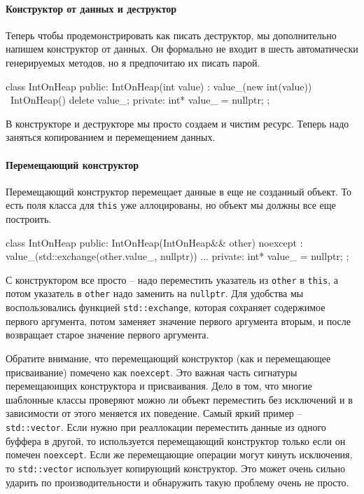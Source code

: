 \paragraph{Конструктор от данных и деструктор}

Теперь чтобы продемонстрировать как писать деструктор, мы дополнительно напишем конструктор от данных.
Он формально не входит в шесть автоматически генерируемых методов, но я предпочитаю их писать парой.
\begin{cppcode}
class IntOnHeap {
public:
  IntOnHeap(int value) : value_(new int(value)) {}
  ~IntOnHeap() {
    delete value_;
  }
private:
  int* value_ = nullptr;
};
\end{cppcode}
В конструкторе и деструкторе мы просто создаем и чистим ресурс.
Теперь надо заняться копированием и перемещением данных.

\paragraph{Перемещающий конструктор}

Перемещающий конструктор перемещает данные в еще не созданный объект.
То есть поля класса для \verb"this" уже аллоцированы, но объект мы должны все еще построить.
\begin{cppcode}
class IntOnHeap {
public:
  IntOnHeap(IntOnHeap&& other) noexcept
   : value_(std::exchange(other.value_, nullptr)) {}
  ...
private:
  int* value_ = nullptr;
};
\end{cppcode}
С конструктором все просто -- надо переместить указатель из \verb"other" в \verb"this", а потом указатель в \verb"other" надо заменить на \verb"nullptr".
Для удобства мы воспользовались функцией \verb"std::exchange", которая сохраняет содержимое первого аргумента, потом заменяет значение первого аргумента вторым, и после возвращает старое значение первого аргумента.

Обратите внимание, что перемещающий конструктор (как и перемещающее присваивание) помечено как \verb"noexcept".
Это важная часть сигнатуры перемещаюищих конструктора и присваивания.
Дело в том, что многие шаблонные классы проверяют можно ли объект переместить без исключений и в зависимости от этого меняется их поведение.
Самый яркий пример -- \verb"std::vector".
Если нужно при реаллокации переместить данные из одного буффера в другой, то используется перемещающий конструктор только если он помечен \verb"noexcept".
Если же перемещающие операции могут кинуть исключения, то \verb"std::vector" использует копирующий конструктор.
Это может очень сильно ударить по производительности и обнаружить такую проблему очень не просто.

